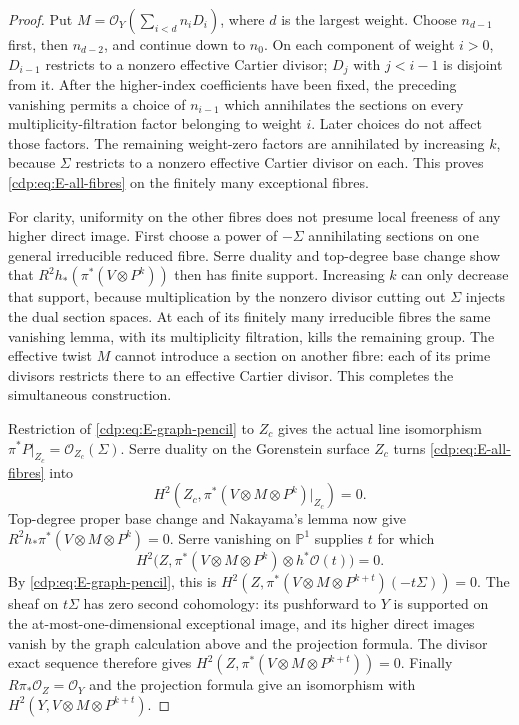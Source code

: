 \begin{proof}
Put $M=\mathcal O_Y(\sum_{i<d}n_iD_i)$, where $d$ is the largest
weight. Choose $n_{d-1}$ first, then $n_{d-2}$, and continue down to
$n_0$. On each component of weight $i>0$, $D_{i-1}$ restricts to a
nonzero effective Cartier divisor; $D_j$ with $j<i-1$ is disjoint
from it. After the higher-index coefficients have been fixed, the
preceding vanishing permits a choice of $n_{i-1}$ which annihilates
the sections on every multiplicity-filtration factor belonging to
weight $i$. Later choices do not affect those factors. The remaining
weight-zero factors are annihilated by increasing $k$, because
$\Sigma$ restricts to a nonzero effective Cartier divisor on each.
This proves \eqref{cdp:eq:E-all-fibres} on the finitely many exceptional
fibres.

For clarity, uniformity on the other fibres does not presume local
freeness of any higher direct image. First choose a power of
$-\Sigma$ annihilating sections on one general irreducible reduced fibre. Serre
duality and top-degree base change show that
$R^2h_*(\pi^*(V\otimes P^k))$ then has finite support. Increasing $k$
can only decrease that support, because multiplication by the
nonzero divisor cutting out $\Sigma$ injects the dual section spaces.
At each of its finitely many irreducible fibres the same vanishing
lemma, with its multiplicity filtration, kills the remaining group.
The effective twist $M$ cannot introduce a section on another fibre:
each of its prime divisors restricts there to an effective Cartier
divisor. This completes the simultaneous construction.

Restriction of \eqref{cdp:eq:E-graph-pencil} to $Z_c$ gives the actual line
isomorphism $\pi^*P|_{Z_c}=\mathcal O_{Z_c}(\Sigma)$. Serre duality
on the Gorenstein surface $Z_c$ turns \eqref{cdp:eq:E-all-fibres} into
\[
 H^2(Z_c,\pi^*(V\otimes M\otimes P^k)|_{Z_c})=0.
\]
Top-degree proper base change and Nakayama's lemma now give
$R^2h_*\pi^*(V\otimes M\otimes P^k)=0$. Serre vanishing on
$\mathbb P^1$ supplies $t$ for which
\[
 H^2\bigl(Z,\pi^*(V\otimes M\otimes P^k)
                       \otimes h^*\mathcal O(t)\bigr)=0.
\]
By \eqref{cdp:eq:E-graph-pencil}, this is
$H^2(Z,\pi^*(V\otimes M\otimes P^{k+t})(-t\Sigma))=0$.
The sheaf on $t\Sigma$ has zero second cohomology: its pushforward to
$Y$ is supported on the at-most-one-dimensional exceptional image,
and its higher direct images vanish by the graph calculation above
and the projection formula. The divisor exact sequence therefore
gives
$H^2(Z,\pi^*(V\otimes M\otimes P^{k+t}))=0$. Finally
$R\pi_*\mathcal O_Z=\mathcal O_Y$ and the projection formula give
an isomorphism with $H^2(Y,V\otimes M\otimes P^{k+t})$.


\end{proof}
